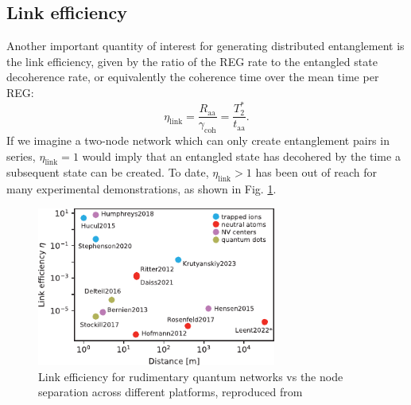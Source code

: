 \subsection{Link efficiency}
Another important quantity of interest for generating distributed entanglement is the link efficiency, given by the ratio of the REG rate to the entangled state decoherence rate, or equivalently the coherence time over the mean time per REG:
\begin{equation}
    \eta_{\text{link}} = \frac{R_{\text{aa}}}{\gamma_{\text{coh}}} = \frac{T_2^*}{t_{\text{aa}}}.
\end{equation}
If we imagine a two-node network which can only create entanglement pairs in series, $\eta_{\text{link}}=1$ would imply that an entangled state has decohered by the time a subsequent state can be created. To date, $\eta_{\text{link}}>1$ has been out of reach for many experimental demonstrations, as shown in Fig. \ref{fig:covey_link_eff}.

\begin{figure}[!ht]
    \centering
    \includegraphics[width=0.7\textwidth]{Images/covey_link_efficiency.pdf}
    \caption{Link efficiency for rudimentary quantum  networks vs the node separation across different platforms, reproduced from \cite{Covey2023}}
    \label{fig:covey_link_eff}
\end{figure}

